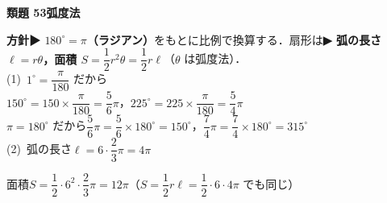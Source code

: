 \documentclass[a4paper,11pt]{ltjsarticle}
\newcommand{\ans}[2]{\Needspace{5\baselineskip}\vspace{6pt}%
  {\sffamily\bfseries 類題 #1\quad #2}\par}
\newcommand{\point}[1]{\textsf{\bfseries ▶ #1}}
\begin{document}
\ans{53}{弧度法}
\begin{kai}
\textbf{方針}\quad \point{$180^\circ=\pi$（ラジアン）}をもとに比例で換算する．扇形は\point{弧の長さ $\ell=r\theta$，面積 $S=\dfrac12r^2\theta=\dfrac12r\ell$}（$\theta$ は弧度法）．\\[2pt]
(1)\ $1^\circ=\dfrac{\pi}{180}$ だから\\
\hspace*{1.5em}$150^\circ=150\times\dfrac{\pi}{180}=\dfrac56\pi$，\quad $225^\circ=225\times\dfrac{\pi}{180}=\dfrac54\pi$\\
\hspace*{1.5em}$\pi=180^\circ$ だから\quad $\dfrac56\pi=\dfrac56\times180^\circ=150^\circ$，\quad $\dfrac74\pi=\dfrac74\times180^\circ=315^\circ$\\[2pt]
(2)\ 弧の長さ\quad $\ell=6\cdot\dfrac23\pi=4\pi$\\
\begin{center}
\end{center}
\hspace*{1.5em}面積\quad $S=\dfrac12\cdot6^2\cdot\dfrac23\pi=12\pi$\quad （$S=\dfrac12r\ell=\dfrac12\cdot6\cdot4\pi$ でも同じ）
\end{kai}
\end{document}
